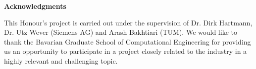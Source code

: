 \clearemptydoublepage
{}
{}	



\vspace*{2cm}

\begin{center}
{\Large \bf Acknowledgments}
\end{center}

\vspace{1cm}

This Honour's project is carried out under the supervision of Dr. Dirk Hartmann, Dr. Utz Wever (Siemens AG) and Arash Bakhtiari (TUM). We would like to thank the Bavarian Graduate School of Computational Engineering for providing us an opportunity to participate in a project closely related to the industry in a highly relevant and challenging topic.